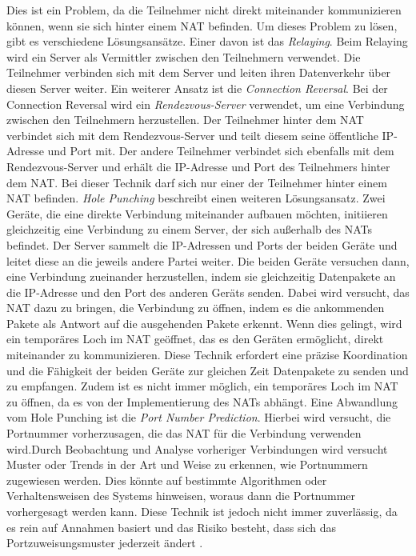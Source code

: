 Dies ist ein Problem, da die Teilnehmer nicht direkt miteinander kommunizieren können, wenn sie sich hinter einem NAT befinden. Um dieses Problem zu lösen, gibt es verschiedene Lösungsansätze. Einer davon ist das \textit{Relaying}. Beim Relaying wird ein Server als Vermittler zwischen den Teilnehmern verwendet. Die Teilnehmer verbinden sich mit dem Server und leiten ihren Datenverkehr über diesen Server weiter. 
Ein weiterer Ansatz ist die \textit{Connection Reversal}. Bei der Connection Reversal wird ein \textit{Rendezvous-Server} verwendet, um eine Verbindung zwischen den Teilnehmern herzustellen. Der Teilnehmer hinter dem NAT verbindet sich mit dem Rendezvous-Server und teilt diesem seine öffentliche IP-Adresse und Port mit. Der andere Teilnehmer verbindet sich ebenfalls mit dem Rendezvous-Server und erhält die IP-Adresse und Port des  Teilnehmers hinter dem NAT. Bei dieser Technik darf sich nur einer der Teilnehmer hinter einem NAT befinden.
\textit{Hole Punching} beschreibt einen weiteren Lösungsansatz. Zwei Geräte, die eine direkte Verbindung miteinander aufbauen möchten, initiieren gleichzeitig eine Verbindung zu einem Server, der sich außerhalb des NATs befindet. Der Server sammelt die IP-Adressen und Ports der beiden Geräte und leitet diese an die jeweils andere Partei weiter. Die beiden Geräte versuchen dann, eine Verbindung zueinander herzustellen, indem sie gleichzeitig Datenpakete an die IP-Adresse und den Port des anderen Geräts senden. Dabei wird versucht, das NAT dazu zu bringen, die Verbindung zu öffnen, indem es die ankommenden Pakete als Antwort auf die ausgehenden Pakete erkennt. Wenn dies gelingt, wird ein temporäres Loch im NAT geöffnet, das es den Geräten ermöglicht, direkt miteinander zu kommunizieren. Diese Technik erfordert eine präzise Koordination und die Fähigkeit der beiden Geräte zur gleichen Zeit Datenpakete zu senden und zu empfangen. Zudem ist es nicht immer möglich, ein temporäres Loch im NAT zu öffnen, da es von der Implementierung des NATs abhängt. Eine Abwandlung vom Hole Punching ist die \textit{Port Number Prediction}. Hierbei wird versucht, die Portnummer vorherzusagen, die das NAT für die Verbindung verwenden wird.Durch Beobachtung und Analyse vorheriger Verbindungen wird versucht Muster oder Trends in der Art und Weise zu erkennen, wie Portnummern zugewiesen werden. Dies könnte auf bestimmte Algorithmen oder Verhaltensweisen des Systems hinweisen, woraus dann die Portnummer vorhergesagt werden kann. Diese Technik ist jedoch nicht immer zuverlässig, da es rein auf Annahmen basiert und das Risiko besteht, dass sich das Portzuweisungsmuster jederzeit ändert \Parencite[S. 7-21]{rfc5128_P2P_NATs}.


